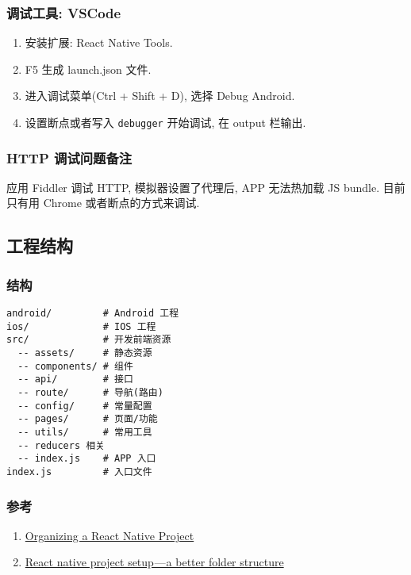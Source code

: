\subsubsection{调试工具: VSCode}\label{ux8c03ux8bd5ux5de5ux5177-vscode}

\begin{enumerate}
\def\labelenumi{\arabic{enumi}.}
\tightlist
\item
  安装扩展: React Native Tools.
\item
  F5 生成 launch.json 文件.
\item
  进入调试菜单(Ctrl + Shift + D), 选择 Debug Android.
\item
  设置断点或者写入 \lstinline!debugger! 开始调试, 在 output 栏输出.
\end{enumerate}

\subsubsection{HTTP
调试问题备注}\label{http-ux8c03ux8bd5ux95eeux9898ux5907ux6ce8}

应用 Fiddler 调试 HTTP, 模拟器设置了代理后, APP 无法热加载 JS bundle.
目前只有用 Chrome 或者断点的方式来调试.

\subsection{工程结构}\label{ux5de5ux7a0bux7ed3ux6784}

\subsubsection{结构}\label{ux7ed3ux6784}

\begin{lstlisting}
android/         # Android 工程
ios/             # IOS 工程
src/             # 开发前端资源
  -- assets/     # 静态资源
  -- components/ # 组件
  -- api/        # 接口
  -- route/      # 导航(路由)
  -- config/     # 常量配置
  -- pages/      # 页面/功能
  -- utils/      # 常用工具
  -- reducers 相关
  -- index.js    # APP 入口
index.js         # 入口文件
\end{lstlisting}

\subsubsection{参考}\label{ux53c2ux8003-2}

\begin{enumerate}
\def\labelenumi{\arabic{enumi}.}
\tightlist
\item
  \href{https://medium.com/the-react-native-log/organizing-a-react-native-project-9514dfadaa0}{Organizing
  a React Native Project}
\item
  \href{https://hackernoon.com/manage-react-native-project-folder-structure-and-simplify-the-code-c98da77ef792}{React
  native project setup --- a better folder structure}
\end{enumerate}

